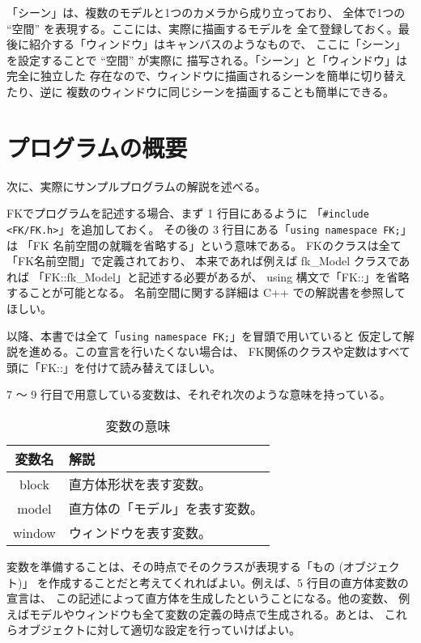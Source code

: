 「シーン」は、複数のモデルと1つのカメラから成り立っており、
全体で1つの ``空間'' を表現する。ここには、実際に描画するモデルを
全て登録しておく。最後に紹介する「ウィンドウ」はキャンバスのようなもので、
ここに「シーン」を設定することで ``空間'' が実際に
描写される。「シーン」と「ウィンドウ」は完全に独立した
存在なので、ウィンドウに描画されるシーンを簡単に切り替えたり、逆に
複数のウィンドウに同じシーンを描画することも簡単にできる。

\section{プログラムの概要}
次に、実際にサンプルプログラムの解説を述べる。

FKでプログラムを記述する場合、まず 1 行目にあるように
「\verb+#include <FK/FK.h>+」を追加しておく。
その後の 3 行目にある「\verb+using namespace FK;+」は
「FK 名前空間の就職を省略する」という意味である。
FKのクラスは全て「FK名前空間」で定義されており、
本来であれば例えば fk\_Model クラスであれば
「FK::fk\_Model」と記述する必要があるが、
using 構文で「FK::」を省略することが可能となる。
名前空間に関する詳細は C++ での解説書を参照してほしい。

以降、本書では全て「\verb+using namespace FK;+」を冒頭で用いていると
仮定して解説を進める。この宣言を行いたくない場合は、
FK関係のクラスや定数はすべて頭に「FK::」を付けて読み替えてほしい。

7 〜 9 行目で用意している変数は、それぞれ次のような意味を持っている。
\begin{table}[H]
\caption{変数の意味}
\label{tbl:samp1}
\begin{center}
\begin{tabular}{|c|l|}
\hline
変数名 & 解説 \\ \hline \hline
block & 直方体形状を表す変数。\\ \hline
model & 直方体の「モデル」を表す変数。\\ \hline
window & ウィンドウを表す変数。\\ \hline
\end{tabular}
\end{center}
\end{table}

変数を準備することは、その時点でそのクラスが表現する「もの (オブジェクト)」
を作成することだと考えてくれればよい。例えば、5 行目の直方体変数の宣言は、
この記述によって直方体を生成したということになる。他の変数、
例えばモデルやウィンドウも全て変数の定義の時点で生成される。あとは、
これらオブジェクトに対して適切な設定を行っていけばよい。

